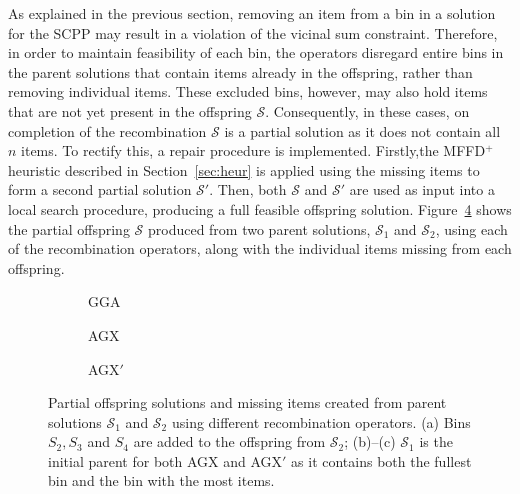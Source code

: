 \documentclass[authoryear]{elsarticle}
\begin{document}
As explained in the previous section, removing an item from a bin in a solution for the SCPP may result in a violation of the vicinal sum constraint. Therefore, in order to maintain feasibility of each bin, the operators disregard entire bins in the parent solutions that contain items already in the offspring, rather than removing individual items. These excluded bins, however, may also hold items that are not yet present in the offspring $\mathcal{S}$. Consequently, in these cases, on completion of the recombination $\mathcal{S}$ is a partial solution as it does not contain all $n$ items. To rectify this, a repair procedure is implemented. Firstly,the MFFD$^+$ heuristic described in Section~\ref{sec:heur} is applied using the missing items to form a second partial solution $\mathcal{S}'$. Then, both $\mathcal{S}$ and $\mathcal{S}'$ are used as input into a local search procedure, producing a full feasible offspring solution. Figure~\ref{fig:recomb} shows the partial offspring $\mathcal{S}$ produced from two parent solutions, $\mathcal{S}_1$ and $\mathcal{S}_2$, using each of the recombination operators, along with the individual items missing from each offspring.

\begin{figure}[H]	
	\centering
	\begin{minipage}{0.3\textwidth}
		
	\end{minipage} \hspace{15mm}
	\begin{minipage}{0.3\textwidth}
		
	\end{minipage}
\end{figure}

\begin{figure}[H]	
	\centering
	\begin{subfigure}[h]{0.3\textwidth}
		
		\caption{GGA}
		\label{fig:gga}
	\end{subfigure} \hspace{5mm}
	\begin{subfigure}[h]{0.3\textwidth}
		
		\caption{AGX}
		\label{fig:agx}
	\end{subfigure} \hspace{5mm}
	\begin{subfigure}[h]{0.3\textwidth}
		
		\caption{AGX$'$}
		\label{fig:agxdash}
	\end{subfigure}
	\caption{Partial offspring solutions and missing items created from parent solutions $\mathcal{S}_1$ and $\mathcal{S}_2$ using different recombination operators. (a) Bins $S_2, S_3$ and $S_4$ are added to the offspring from $\mathcal{S}_2$; (b)--(c) $\mathcal{S}_1$ is the initial parent for both AGX and AGX$'$ as it contains both the fullest bin and the bin with the most items.}
	\label{fig:recomb}
\end{figure}
\end{document}
